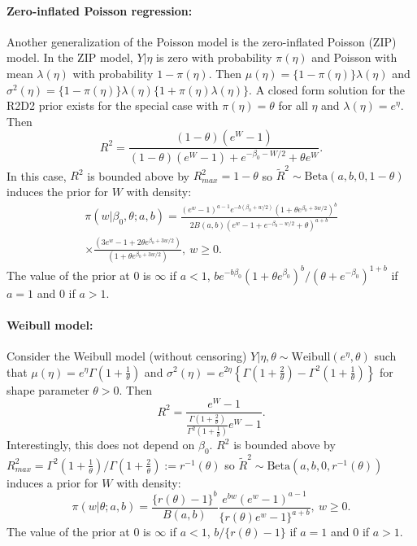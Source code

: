 \documentclass[12pt]{article}
\begin{document}
\paragraph{Zero-inflated Poisson regression:} Another generalization of the Poisson model is the zero-inflated Poisson (ZIP) model. In the ZIP model, $Y|\eta$ is zero with probability $\pi(\eta)$ and Poisson with mean $\lambda(\eta)$ with probability $1-\pi(\eta)$.  Then $\mu(\eta)=\{1-\pi(\eta)\}\lambda(\eta)$ and $\sigma^2(\eta)=\{1-\pi(\eta)\}\lambda(\eta)\{1+\pi(\eta)\lambda(\eta)\}$. A closed form solution for the R2D2 prior exists for the special case with $\pi(\eta) = \theta$ for all $\eta$ and $\lambda(\eta)=e^\eta$.  Then
\begin{equation}
   R^2 = \frac{(1-\theta)(e^W-1)}{(1-\theta)(e^W-1)
     + e^{-\beta_0-W/2} + \theta e^{W}}.
\end{equation}
In this case, $R^2$ is bounded above by $R^2_{max}=1-\theta$ so $\tilde R^2\sim\mbox{Beta}(a,b,0,1-\theta)$ induces the prior for $W$ with density:
\begin{multline}
    \pi(w|\beta_0,\theta;a,b)
    = \frac{(e^w-1)^{a-1} e^{-b(\beta_0+w/2)}(1+\theta e^{\beta_0+3w/2})^b}
    {2B(a,b)(e^w-1+e^{-\beta_0-w/2}+\theta)^{a+b}} \\
    \times \frac{(3e^w-1+2\theta e^{\beta_0+3w/2})}
    {(1+\theta e^{\beta_0+3w/2})},\ w\geq0.
\end{multline}
The value of the prior at 0 is $\infty$ if $a<1$, $be^{-b\beta_0}(1+\theta e^{\beta_0})^b/(\theta+e^{-\beta_0})^{1+b}$ if $a=1$ and 0 if $a>1$.

\paragraph{Weibull model:} Consider the Weibull model (without censoring) $Y|\eta,\theta\sim \mbox{Weibull}(e^\eta,\theta)$ such that $\mu(\eta)=e^{\eta}\Gamma\left(1+\frac1\theta\right)$ and $\sigma^2(\eta)=e^{2\eta}\left\{\Gamma\left(1+\frac2\theta\right)-\Gamma^2\left(1+\frac1\theta\right)\right\}$ for shape parameter $\theta>0$. Then
\begin{equation}
    R^2
    =\frac{e^W-1}{\frac{\Gamma(1+\frac2\theta)}{\Gamma^2(1+\frac1\theta)}e^W-1}.
\end{equation}
Interestingly, this does not depend on $\beta_0$. $R^2$ is bounded above by $R^2_{max}=\Gamma^2(1+\frac1\theta)/\Gamma(1+\frac2\theta):=r^{-1}(\theta)$ so $\tilde R^2\sim \mbox{Beta}(a,b,0,r^{-1}(\theta))$ induces a prior for $W$ with density:
\begin{equation}
    \pi(w|\theta;a,b)
    =\frac{\{r(\theta)-1\}^b}{B(a,b)}\frac{e^{bw}(e^w-1)^{a-1}}{\{r(\theta)e^w-1\}^{a+b}},\ w\geq0.
\end{equation}
The value of the prior at 0 is $\infty$ if $a<1$, $b/\{r(\theta)-1\}$ if $a=1$ and 0 if $a>1$.
\end{document}
